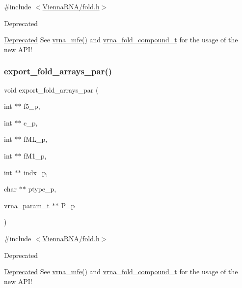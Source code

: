 {\ttfamily \#include $<$\hyperlink{fold_8h}{Vienna\+R\+N\+A/fold.\+h}$>$}

\begin{DoxyRefDesc}{Deprecated}
\item[\hyperlink{deprecated__deprecated000076}{Deprecated}]See \hyperlink{group__mfe__fold_gabd3b147371ccf25c577f88bbbaf159fd}{vrna\+\_\+mfe()} and \hyperlink{group__fold__compound_ga1b0cef17fd40466cef5968eaeeff6166}{vrna\+\_\+fold\+\_\+compound\+\_\+t} for the usage of the new A\+P\+I!\end{DoxyRefDesc}
\mbox{\label{group__mfe__fold__single_ga6606ec0ec964ea506fdadb997a1a5328}} 
\subsubsection{\texorpdfstring{export\+\_\+fold\+\_\+arrays\+\_\+par()}{export\_fold\_arrays\_par()}}
{\footnotesize\ttfamily void export\+\_\+fold\+\_\+arrays\+\_\+par (\begin{DoxyParamCaption}\item[{int $\ast$$\ast$}]{f5\+\_\+p,  }\item[{int $\ast$$\ast$}]{c\+\_\+p,  }\item[{int $\ast$$\ast$}]{f\+M\+L\+\_\+p,  }\item[{int $\ast$$\ast$}]{f\+M1\+\_\+p,  }\item[{int $\ast$$\ast$}]{indx\+\_\+p,  }\item[{char $\ast$$\ast$}]{ptype\+\_\+p,  }\item[{\hyperlink{group__energy__parameters_ga8a69ca7d787e4fd6079914f5343a1f35}{vrna\+\_\+param\+\_\+t} $\ast$$\ast$}]{P\+\_\+p }\end{DoxyParamCaption})}



{\ttfamily \#include $<$\hyperlink{fold_8h}{Vienna\+R\+N\+A/fold.\+h}$>$}

\begin{DoxyRefDesc}{Deprecated}
\item[\hyperlink{deprecated__deprecated000077}{Deprecated}]See \hyperlink{group__mfe__fold_gabd3b147371ccf25c577f88bbbaf159fd}{vrna\+\_\+mfe()} and \hyperlink{group__fold__compound_ga1b0cef17fd40466cef5968eaeeff6166}{vrna\+\_\+fold\+\_\+compound\+\_\+t} for the usage of the new A\+P\+I!\end{DoxyRefDesc}
\mbox{\label{group__mfe__fold__single_ga04d5d639fd4473ca766436a9bae5665c}} 
